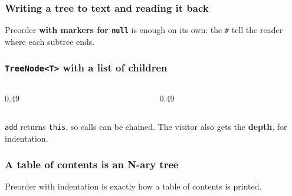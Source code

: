 \documentclass[aspectratio=169,10pt,compress]{beamer}
\begin{document}
\begin{frame}[t,fragile] \frametitle{Writing a tree to text and reading it back}

  \vspace{0.2em}
  \small Preorder \textbf{with markers for \texttt{null}} is enough on its own: the \texttt{\#} tell the reader where each subtree ends.
\end{frame}





\begin{frame}[t,fragile] \frametitle{\texttt{TreeNode<T>} with a list of children}
  \begin{columns}[T]
    \begin{column}{0.49\textwidth}
    \end{column}
    \begin{column}{0.49\textwidth}
    \end{column}
  \end{columns}

  \small \texttt{add} returns \texttt{this}, so calls can be chained. The visitor also gets the \textbf{depth}, for indentation.
\end{frame}




\begin{frame}[t,fragile] \frametitle{A table of contents is an N-ary tree}

  \vspace{0.2em}
  \small Preorder with indentation is exactly how a table of contents is printed.
\end{frame}
\end{document}
